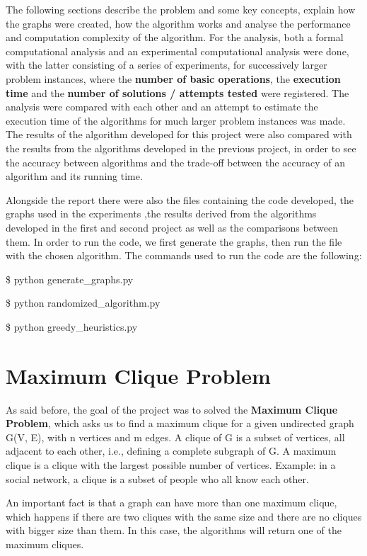 \documentclass[]{revdetua}
\begin{document}
The following sections describe the problem and some key concepts, explain how the graphs were created, how the algorithm works and analyse the performance and computation complexity of the algorithm. For the analysis, both a formal computational analysis and an experimental computational analysis were done, with the latter consisting of a series of experiments, for successively larger problem instances, where the \textbf{number of basic operations}, the \textbf{execution time} and the \textbf{number of solutions / attempts tested} were registered. The analysis were compared with each other and an attempt to estimate the execution time of the algorithms for much larger problem instances was made. The results of the algorithm developed for this project were also compared with the results from the algorithms developed in the previous project, in order to see the accuracy between algorithms and the trade-off between the accuracy of an algorithm and its running time. 

Alongside the report there were also the files containing the code developed, the graphs used in the experiments ,the results derived from the algorithms developed in the first and second project as well as the comparisons between them. In order to run the code, we first generate the graphs, then run the file with the chosen algorithm. The commands used to run the code are the following: \linebreak

\$ python generate\_graphs.py 

\$ python randomized\_algorithm.py

\$ python greedy\_heuristics.py

\section{Maximum Clique Problem}

As said before, the goal of the project was to solved the \textbf{Maximum Clique Problem}, which asks us to find a maximum clique for a given undirected graph G(V, E), with n vertices and m edges. A clique of G is a subset of vertices, all adjacent to each other, i.e., defining a complete subgraph of G. A maximum clique is a clique with the largest possible number of vertices. Example: in a social network, a clique is a subset of people who all know each other.

An important fact is that a graph can have more than one maximum clique, which happens if there are two cliques with the same size and there are no cliques with bigger size than them. In this case, the algorithms will return one of the maximum cliques.
\end{document}
